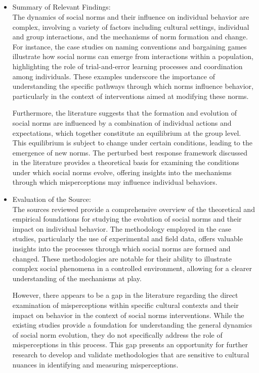 \documentclass{article}
\begin{document}
\subsection{}
\begin{itemize}
    \item Summary of Relevant Findings:\\
The dynamics of social norms and their influence on individual behavior are complex, involving a variety of factors including cultural settings, individual and group interactions, and the mechanisms of norm formation and change. For instance, the case studies on naming conventions and bargaining games illustrate how social norms can emerge from interactions within a population, highlighting the role of trial-and-error learning processes and coordination among individuals. These examples underscore the importance of understanding the specific pathways through which norms influence behavior, particularly in the context of interventions aimed at modifying these norms.

Furthermore, the literature suggests that the formation and evolution of social norms are influenced by a combination of individual actions and expectations, which together constitute an equilibrium at the group level. This equilibrium is subject to change under certain conditions, leading to the emergence of new norms. The perturbed best response framework discussed in the literature provides a theoretical basis for examining the conditions under which social norms evolve, offering insights into the mechanisms through which misperceptions may influence individual behaviors.
\end{itemize}
\begin{itemize}
    \item Evaluation of the Source:\\
The sources reviewed provide a comprehensive overview of the theoretical and empirical foundations for studying the evolution of social norms and their impact on individual behavior. The methodology employed in the case studies, particularly the use of experimental and field data, offers valuable insights into the processes through which social norms are formed and changed. These methodologies are notable for their ability to illustrate complex social phenomena in a controlled environment, allowing for a clearer understanding of the mechanisms at play.

However, there appears to be a gap in the literature regarding the direct examination of misperceptions within specific cultural contexts and their impact on behavior in the context of social norms interventions. While the existing studies provide a foundation for understanding the general dynamics of social norm evolution, they do not specifically address the role of misperceptions in this process. This gap presents an opportunity for further research to develop and validate methodologies that are sensitive to cultural nuances in identifying and measuring misperceptions.
\end{itemize}
\end{document}
